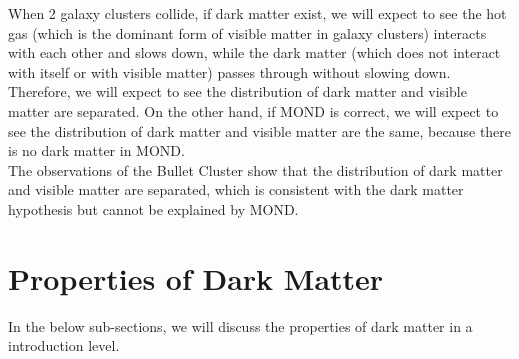 \begin{extra}
    When 2 galaxy clusters collide, if dark matter exist, we will expect to see the hot gas (which is the dominant form of visible matter in galaxy clusters) interacts with each other and slows down, while the dark matter (which does not interact with itself or with visible matter) passes through without slowing down. Therefore, we will expect to see the distribution of dark matter and visible matter are separated. On the other hand, if MOND is correct, we will expect to see the distribution of dark matter and visible matter are the same, because there is no dark matter in MOND. \\
    
    The observations of the Bullet Cluster show that the distribution of dark matter and visible matter are separated, which is consistent with the dark matter hypothesis but cannot be explained by MOND.
\end{extra}









\clearpage
\section{Properties of Dark Matter}
In the below sub-sections, we will discuss the properties of dark matter in a introduction level.

